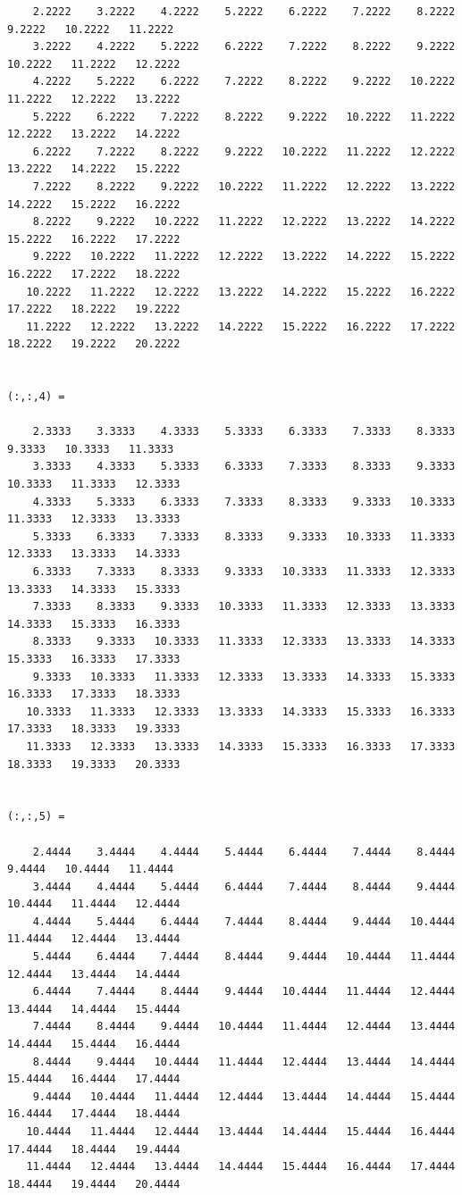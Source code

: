 \documentclass[
]{book}
\begin{document}
\begin{verbatim}
    2.2222    3.2222    4.2222    5.2222    6.2222    7.2222    8.2222    9.2222   10.2222   11.2222
    3.2222    4.2222    5.2222    6.2222    7.2222    8.2222    9.2222   10.2222   11.2222   12.2222
    4.2222    5.2222    6.2222    7.2222    8.2222    9.2222   10.2222   11.2222   12.2222   13.2222
    5.2222    6.2222    7.2222    8.2222    9.2222   10.2222   11.2222   12.2222   13.2222   14.2222
    6.2222    7.2222    8.2222    9.2222   10.2222   11.2222   12.2222   13.2222   14.2222   15.2222
    7.2222    8.2222    9.2222   10.2222   11.2222   12.2222   13.2222   14.2222   15.2222   16.2222
    8.2222    9.2222   10.2222   11.2222   12.2222   13.2222   14.2222   15.2222   16.2222   17.2222
    9.2222   10.2222   11.2222   12.2222   13.2222   14.2222   15.2222   16.2222   17.2222   18.2222
   10.2222   11.2222   12.2222   13.2222   14.2222   15.2222   16.2222   17.2222   18.2222   19.2222
   11.2222   12.2222   13.2222   14.2222   15.2222   16.2222   17.2222   18.2222   19.2222   20.2222


(:,:,4) =

    2.3333    3.3333    4.3333    5.3333    6.3333    7.3333    8.3333    9.3333   10.3333   11.3333
    3.3333    4.3333    5.3333    6.3333    7.3333    8.3333    9.3333   10.3333   11.3333   12.3333
    4.3333    5.3333    6.3333    7.3333    8.3333    9.3333   10.3333   11.3333   12.3333   13.3333
    5.3333    6.3333    7.3333    8.3333    9.3333   10.3333   11.3333   12.3333   13.3333   14.3333
    6.3333    7.3333    8.3333    9.3333   10.3333   11.3333   12.3333   13.3333   14.3333   15.3333
    7.3333    8.3333    9.3333   10.3333   11.3333   12.3333   13.3333   14.3333   15.3333   16.3333
    8.3333    9.3333   10.3333   11.3333   12.3333   13.3333   14.3333   15.3333   16.3333   17.3333
    9.3333   10.3333   11.3333   12.3333   13.3333   14.3333   15.3333   16.3333   17.3333   18.3333
   10.3333   11.3333   12.3333   13.3333   14.3333   15.3333   16.3333   17.3333   18.3333   19.3333
   11.3333   12.3333   13.3333   14.3333   15.3333   16.3333   17.3333   18.3333   19.3333   20.3333


(:,:,5) =

    2.4444    3.4444    4.4444    5.4444    6.4444    7.4444    8.4444    9.4444   10.4444   11.4444
    3.4444    4.4444    5.4444    6.4444    7.4444    8.4444    9.4444   10.4444   11.4444   12.4444
    4.4444    5.4444    6.4444    7.4444    8.4444    9.4444   10.4444   11.4444   12.4444   13.4444
    5.4444    6.4444    7.4444    8.4444    9.4444   10.4444   11.4444   12.4444   13.4444   14.4444
    6.4444    7.4444    8.4444    9.4444   10.4444   11.4444   12.4444   13.4444   14.4444   15.4444
    7.4444    8.4444    9.4444   10.4444   11.4444   12.4444   13.4444   14.4444   15.4444   16.4444
    8.4444    9.4444   10.4444   11.4444   12.4444   13.4444   14.4444   15.4444   16.4444   17.4444
    9.4444   10.4444   11.4444   12.4444   13.4444   14.4444   15.4444   16.4444   17.4444   18.4444
   10.4444   11.4444   12.4444   13.4444   14.4444   15.4444   16.4444   17.4444   18.4444   19.4444
   11.4444   12.4444   13.4444   14.4444   15.4444   16.4444   17.4444   18.4444   19.4444   20.4444



\end{verbatim}
\end{document}
